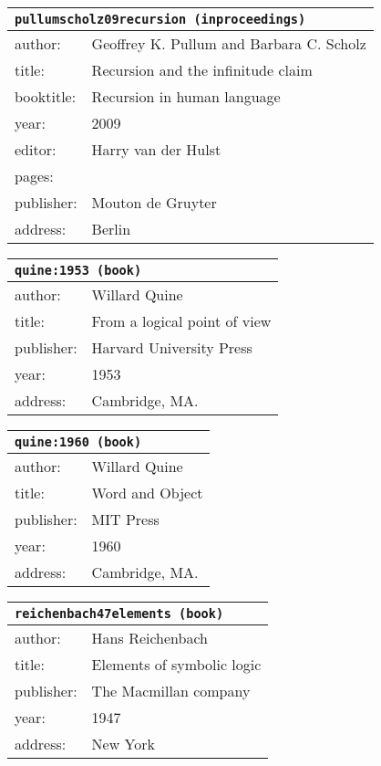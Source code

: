 \documentclass{article}
\begin{document}
\bigskip

\begin{tabular}{p{}p{}}
\multicolumn{2}{l}{\texttt{pullumscholz09recursion (inproceedings)}}\\
\hline
author: & Geoffrey K. Pullum and Barbara C. Scholz\\
title: & Recursion and the infinitude claim\\
booktitle: & Recursion in human language\\
year: & 2009\\
editor: & Harry {van der Hulst}\\
pages: & \\
publisher: & Mouton de Gruyter\\
address: & Berlin\\
\end{tabular}

\bigskip

\begin{tabular}{p{}p{}}
\multicolumn{2}{l}{\texttt{quine:1953 (book)}}\\
\hline
author: & Willard Quine\\
title: & From a logical point of view\\
publisher: & Harvard University Press\\
year: & 1953\\
address: & Cambridge, MA.\\
\end{tabular}

\bigskip

\begin{tabular}{p{}p{}}
\multicolumn{2}{l}{\texttt{quine:1960 (book)}}\\
\hline
author: & Willard Quine\\
title: & Word and Object\\
publisher: & MIT Press\\
year: & 1960\\
address: & Cambridge, MA.\\
\end{tabular}

\bigskip

\begin{tabular}{p{}p{}}
\multicolumn{2}{l}{\texttt{reichenbach47elements (book)}}\\
\hline
author: & Hans Reichenbach\\
title: & Elements of symbolic logic\\
publisher: & The Macmillan company\\
year: & 1947\\
address: & New York\\
\end{tabular}
\end{document}
